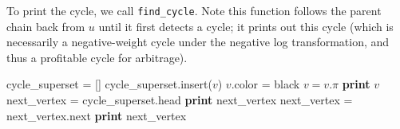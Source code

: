 \documentclass[paper=a4, fontsize=11pt]{scrartcl} %
\numberwithin{equation}{section} %
\numberwithin{figure}{section} %
\numberwithin{table}{section} %
\begin{document}
To print the cycle, we call \texttt{find\_cycle}. Note this function follows the parent chain back from $u$ until it first detects a cycle; it prints out this cycle (which is necessarily a negative-weight cycle under the negative log transformation, and thus a profitable cycle for arbitrage).

\begin{algorithmic}
	\State cycle\_superset = [] 
	 
		\State cycle\_superset.insert($v$)
		\State $v$.color = black
		\State $v = v.\pi$
	\EndWhile
	\State \textbf{print} $v$ 
	\State next\_vertex = cycle\_superset.head  
		\State \textbf{print} next\_vertex
		\State next\_vertex = next\_vertex.next
	\EndWhile
	\State \textbf{print} next\_vertex 
\EndFunction
\end{algorithmic}



\end{document}

